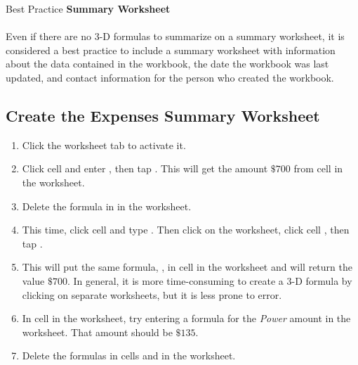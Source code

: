 \begin{center}
	\begin{infobox}{Best Practice}
		\textbf{Summary Worksheet}
		\\
		\\
		Even if there are no $ 3 $-D formulas to summarize on a summary worksheet, it is considered a best practice to include a summary worksheet with information about the data contained in the workbook, the date the workbook was last updated, and contact information for the person who created the workbook.
	\end{infobox}
\end{center}

\subsection{Create the Expenses Summary Worksheet}

\begin{enumbox}
	\begin{enumerate}
		\item Click the  worksheet tab to activate it.
		\item Click cell  and enter , then tap . This will get the amount $ \$700 $ from cell  in the  worksheet.
		\item Delete the formula in  in the  worksheet.
		\item This time, click cell  and type \fmtTyping{=}. Then click on the  worksheet, click cell , then tap .
		\item This will put the same formula, , in cell  in the  worksheet and will return the value $ \$700 $. In general, it is more time-consuming to create a $ 3 $-D formula by clicking on separate worksheets, but it is less prone to error.
		\item In cell  in the  worksheet, try entering a formula for the \textit{Power} amount in the  worksheet. That amount should be $ \$135 $.
		\item Delete the formulas in cells  and  in the  worksheet.
	\end{enumerate}
\end{enumbox}

